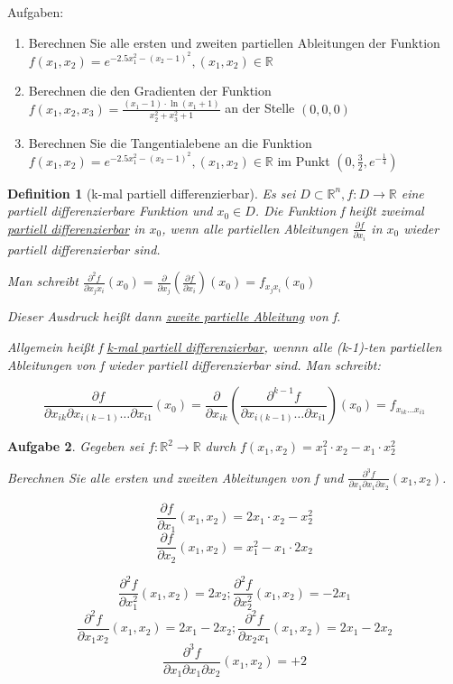 \documentclass[12pt,a4paper]{scrreprt}
\newtheorem{defi}{Definition}[section]
\newtheorem{aufg}[defi]{Aufgabe}
\begin{document}
Aufgaben:

\begin{enumerate}
	\item Berechnen Sie alle ersten und zweiten partiellen Ableitungen der Funktion $f(x_1,x_2)=e^{-2.5x_1^2-{(x_2-1)}^2}, (x_1,x_2) \in \mathbb{R}$
	\item Berechnen die den Gradienten der Funktion $f(x_1,x_2,x_3)=\frac{(x_1-1)\cdot\ln(x_1+1)}{x_2^2+x_3^2+1}$ an der Stelle $(0,0,0)$
	\item Berechnen Sie die Tangentialebene an die Funktion  $f(x_1,x_2)=e^{-2.5x_1^2-{(x_2-1)}^2}, (x_1,x_2) \in \mathbb{R}$ im Punkt $(0,\frac{3}{2},e^{-\frac{1}{4}})$
\end{enumerate}

\begin{defi}[k-mal partiell differenzierbar]
	Es sei $D\subset\mathbb{R}^n,f:D\to\mathbb{R}$ eine partiell differenzierbare Funktion und $x_0 \in D$. Die Funktion f heißt zweimal \underline{partiell differenzierbar} in $x_0$, wenn alle partiellen Ableitungen $\frac{\partial f}{\partial x_i}$ in $x_0$ wieder partiell differenzierbar sind.

	Man schreibt $\frac{\partial^2 f}{\partial x_j x_i}(x_0)=\frac{\partial}{\partial x_j}\left(\frac{\partial f}{\partial x_i}\right)(x_0)=f_{x_j x_i}(x_0)$

	Dieser Ausdruck heißt dann \underline{zweite partielle Ableitung} von f.

	Allgemein heißt f \underline{k-mal partiell differenzierbar}, wennn alle (k-1)-ten partiellen Ableitungen von f wieder partiell differenzierbar sind. Man schreibt:

	\[\frac{\partial f}{\partial x_{ik} \partial x_{i(k-1)} \dots \partial x_{i1}}(x_0) = \frac{\partial}{\partial x_{ik}}\left(\frac{\partial^{k-1} f}{\partial x_{i(k-1)} \dots \partial x_{i1}}\right)(x_0)=f_{x_{ik} \dots x_{i1}}\]
\end{defi}

\begin{aufg}
	Gegeben sei $f:\mathbb{R}^2\to\mathbb{R}$ durch $f(x_1,x_2)=x_1^2 \cdot x_2 - x_1 \cdot x_2^2$

	Berechnen Sie alle ersten und zweiten Ableitungen von f und $\frac{\partial^3 f}{\partial x_1 \partial x_1 \partial x_2}(x_1,x_2)$.

	\[\frac{\partial f}{\partial x_1}(x_1,x_2)=2x_1 \cdot x_2 - x_2^2 \]
	\[\frac{\partial f}{\partial x_2}(x_1,x_2)=x_1^2 - x_1 \cdot 2x_2 \]

	\[\frac{\partial^2 f}{\partial x_1^2}(x_1,x_2)=2x_2 ; \frac{\partial^2 f}{\partial x_2^2}(x_1,x_2)=-2x_1 \]
	\[\frac{\partial^2 f}{\partial x_1x_2}(x_1,x_2)=2x_1-2x_2 ; \frac{\partial^2 f}{\partial x_2x_1}(x_1,x_2)=2x_1-2x_2 \]
	\[\frac{\partial^3 f}{\partial x_1 \partial x_1 \partial x_2}(x_1,x_2)=+2\]
\end{aufg}
\end{document}
